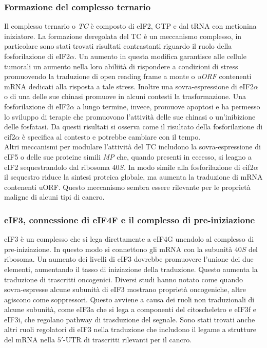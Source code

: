 		\subsubsection{Formazione del complesso ternario}
		Il complesso ternario o \emph{TC} \`e composto di eIF2, GTP e dal tRNA con metionina iniziatore.
		La formazione deregolata del TC \`e un meccanismo complesso, in particolare sono stati trovati risultati contrastanti riguardo il ruolo della fosforilazione di eIF2$\alpha$.
		Un aumento in questa modifica garantisce alle cellule tumorali un aumento nella loro abiliit\`a di rispondere a condizioni di stress promuovendo la traduzione di open reading frame a monte o \emph{uORF} contenenti mRNA dedicati alla risposta a tale stress.
		Inoltre una sovra-espressione di eIF2$\alpha$ o di una delle sue chinasi promuove in alcuni contesti la trasformazione.
		Una fosforilazione di eIF2$\alpha$ a lungo termine, invece, promuove apoptosi e ha permesso lo sviluppo di terapie che promuovono l'attivit\`a delle sue chinasi o un'inibizione delle fosfatasi.
		Da questi risultati si osserva come il risultato della fosforilazione di eif2$\alpha$ \`e specifica al contesto e potrebbe cambiare con il tempo.\\
		Altri meccanismi per modulare l'attivit\`a del TC includono la sovra-espressione di eIF5 o delle sue proteine simili \emph{MP} che, quando presenti in eccesso, si leagno a eIF2 sequestrandolo dal ribosoma $40S$.
		In modo simile alla fosforilazione di eif2$\alpha$ il sequestro riduce la sintesi proteica globale, ma aumenta la traduzione di mRNA contenenti uORF.
		Questo meccanismo sembra essere rilevante per le propriet\`a maligne di alcuni tipi di cancro.

		\subsubsection{eIF3, connessione di eIF4F e il complesso di pre-iniziazione}
		eIF3 \`e un complesso che si lega direttamente a eIF4G unendolo al complesso di pre-iniziazione.
		In questo modo si connettono gli mRNA con la subunit\`a $40S$ del ribosoma.
		Un aumento dei livelli di eIF3 dovrebbe promuovere l'unione dei due elementi, aumentando il tasso di iniziazione della traduzione.
		Questo aumenta la traduzione di trascritti oncogenici.
		Diversi studi hanno notato come quando sovra-espresse alcune subunit\`a di eIF3 mostrano propriet\`a oncogeniche, altre agiscono come soppressori.
		Questo avviene a causa dei ruoli non traduzionali di alcune subunit\`a, come eIF3a che si lega a componenti del citoscheletro e eIF3f e eIF3i, che regolano pathway di trasduzione del segnale.
		Sono stati trovati anche altri ruoli regolatori di eIF3 nella traduzione che includono il legame a strutture del mRNA nella $5'$-UTR di trascritti rilevanti per il cancro.

